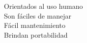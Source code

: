 \documentclass[preview]{standalone}
\begin{document}
Orientados al uso humano\\Son fáciles de manejar\\Fácil mantenimiento\\Brindan portabilidad\\
\end{document}

